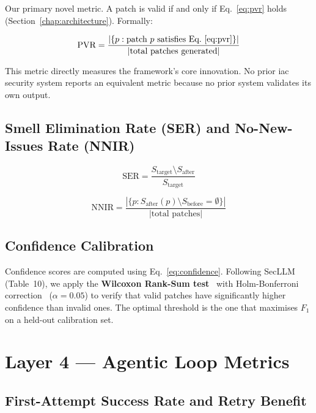 \documentclass[12pt, a4paper]{report}
\begin{document}
Our primary novel metric. A patch is valid if and only if Eq.~\ref{eq:pvr} holds
(Section~\ref{chap:architecture}). Formally:

\begin{equation}
  \text{PVR} = \frac{|\{p : \text{patch } p \text{ satisfies Eq.}~\ref{eq:pvr}\}|}
                    {|\text{total patches generated}|}
  \label{eq:pvr_metric}
\end{equation}

This metric directly measures the framework's core innovation. No prior
\gls{iac} security system reports an equivalent metric because no prior system
validates its own output.

\subsection{Smell Elimination Rate (SER) and No-New-Issues Rate (NNIR)}

\begin{equation}
  \text{SER} = \frac{S_{\text{target}} \setminus S_{\text{after}}}{S_{\text{target}}}
  \label{eq:ser}
\end{equation}

\begin{equation}
  \text{NNIR} = \frac{|\{p : S_{\text{after}}(p) \setminus S_{\text{before}} = \emptyset\}|}
                     {|\text{total patches}|}
  \label{eq:nnir}
\end{equation}

\subsection{Confidence Calibration}

Confidence scores are computed using Eq.~\ref{eq:confidence}. Following
SecLLM~\citep{devito2025secllm} (Table~10), we apply the \textbf{Wilcoxon
Rank-Sum test}~\citep{wilcoxon1945} with Holm-Bonferroni correction~\citep{holm1979}
($\alpha = 0.05$) to verify that valid patches have significantly higher confidence
than invalid ones. The optimal threshold is the one that maximises $F_1$ on a held-out
calibration set.

\section{Layer 4 --- Agentic Loop Metrics}

\subsection{First-Attempt Success Rate and Retry Benefit}
\end{document}
